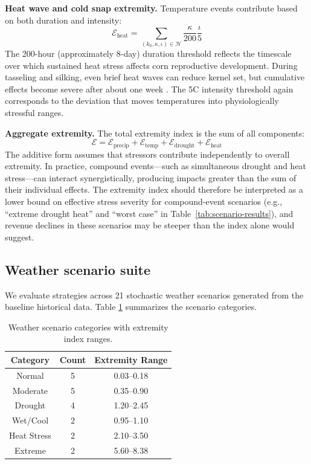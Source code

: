 \documentclass[pdflatex,sn-mathphys-num]{sn-jnl}
\newcommand{\df}[2]{\displaystyle\frac{#1}{#2}}
\begin{document}
\textbf{Heat wave and cold snap extremity.} Temperature events contribute based on both duration and intensity:
\begin{equation}
\mathcal{E}_{\text{heat}} = \sum_{(k_{0}, \kappa, \iota)\in \mathcal{H}} \df{\kappa}{200}\df{\iota}{5}
\label{eqn:extreme-heatwave}
\end{equation}
The 200-hour (approximately 8-day) duration threshold reflects the timescale over which sustained heat stress affects corn reproductive development. During tasseling and silking, even brief heat waves can reduce kernel set, but cumulative effects become severe after about one week \cite{hatfield2015temperature}. The 5\textdegree C intensity threshold again corresponds to the deviation that moves temperatures into physiologically stressful ranges.

\textbf{Aggregate extremity.} The total extremity index is the sum of all components:
\begin{equation}
\mathcal{E} = \mathcal{E}_{\text{precip}} + \mathcal{E}_{\text{temp}} + \mathcal{E}_{\text{drought}} + \mathcal{E}_{\text{heat}}
\label{eqn:extremity}
\end{equation}
The additive form assumes that stressors contribute independently to overall extremity. In practice, compound events---such as simultaneous drought and heat stress---can interact synergistically, producing impacts greater than the sum of their individual effects. The extremity index should therefore be interpreted as a lower bound on effective stress severity for compound-event scenarios (e.g., ``extreme drought heat'' and ``worst case'' in Table~\ref{tab:scenario-results}), and revenue declines in these scenarios may be steeper than the index alone would suggest.

\subsection{Weather scenario suite}\label{subsec:weather-scenarios}

We evaluate strategies across 21 stochastic weather scenarios generated from the baseline historical data. Table \ref{tab:scenario-categories} summarizes the scenario categories.

\begin{table}[ht]
\centering
\begin{tabular}{|c|c|c|}
\hline
Category    & Count & Extremity Range \\
\hline\hline
Normal      & 5     & 0.03--0.18      \\
Moderate    & 5     & 0.35--0.90      \\
Drought     & 4     & 1.20--2.45      \\
Wet/Cool    & 2     & 0.95--1.10      \\
Heat Stress & 2     & 2.10--3.50      \\
Extreme     & 2     & 5.60--8.38      \\
\hline
\end{tabular}
\caption{Weather scenario categories with extremity index ranges.}
\label{tab:scenario-categories}
\end{table}
\end{document}

